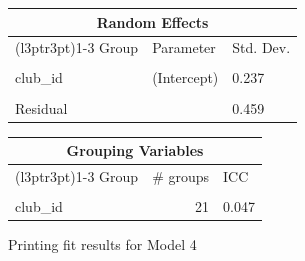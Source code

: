 \documentclass[
  12pt]{article}
\begin{document}
\begin{table}[!h]
\begin{threeparttable}
\begin{tablenotes}
\end{tablenotes}
\end{threeparttable}
\end{table} \begin{table}[!h]
\centering
\begin{tabular}{lll}
\toprule
\multicolumn{3}{c}{Random Effects} \\
\cmidrule(l{3pt}r{3pt}){1-3}
Group & Parameter & Std. Dev.\\
\midrule
\cellcolor{gray!10}{player\_id} & \cellcolor{gray!10}{(Intercept)} & \cellcolor{gray!10}{0.960}\\
club\_id & (Intercept) & 0.237\\
\cellcolor{gray!10}{club\_id} & \cellcolor{gray!10}{season\_year\_c} & \cellcolor{gray!10}{0.019}\\
Residual &  & 0.459\\
\bottomrule
\end{tabular}
\end{table} \begin{table}[!h]
\centering
\begin{tabular}{lrl}
\toprule
\multicolumn{3}{c}{Grouping Variables} \\
\cmidrule(l{3pt}r{3pt}){1-3}
Group & \# groups & ICC\\
\midrule
\cellcolor{gray!10}{player\_id} & \cellcolor{gray!10}{2159} & \cellcolor{gray!10}{0.775}\\
club\_id & 21 & 0.047\\
\bottomrule
\end{tabular}
\end{table}

\clearpage

\newpage

Printing fit results for Model 4
\end{document}
